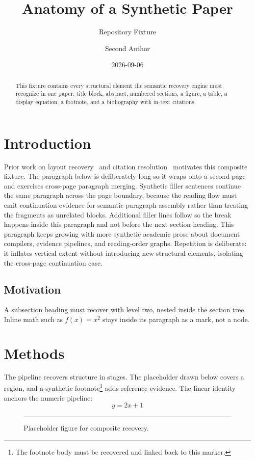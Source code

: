 \documentclass[11pt,a4paper]{article}
\title{Anatomy of a Synthetic Paper}
\author{Repository Fixture \and Second Author}
\date{2026-09-06}%
\begin{document}
\maketitle

\begin{abstract}
  This fixture contains every structural element the semantic recovery
  engine must recognize in one paper: title block, abstract, numbered
  sections, a figure, a table, a display equation, a footnote, and a
  bibliography with in-text citations.
\end{abstract}

\section{Introduction}
Prior work on layout recovery~\cite{smith2020docs} and citation
resolution~\cite{doe2021refs} motivates this composite fixture. The
paragraph below is deliberately long so it wraps onto a second page and
exercises cross-page paragraph merging.
Synthetic filler sentences continue the same paragraph across the page
boundary, because the reading flow must emit continuation evidence for
semantic paragraph assembly rather than treating the fragments as
unrelated blocks. Additional filler lines follow so the break happens
inside this paragraph and not before the next section heading. This
paragraph keeps growing with more synthetic academic prose about
document compilers, evidence pipelines, and reading-order graphs.
Repetition is deliberate: it inflates vertical extent without
introducing new structural elements, isolating the cross-page
continuation case.

\subsection{Motivation}
A subsection heading must recover with level two, nested inside the
section tree. Inline math such as \(f(x) = x^{2}\) stays inside its
paragraph as a mark, not a node.

\section{Methods}
The pipeline recovers structure in stages. The placeholder drawn below
covers a region, and a synthetic footnote\footnote{The footnote body
  must be recovered and linked back to this marker.} adds reference
evidence. The linear identity anchors the numeric pipeline:
\begin{equation}
  y = 2x + 1
\end{equation}
\begin{figure}[htbp]
  \centering
  \rule{0.5\textwidth}{3cm}%
  \caption{Placeholder figure for composite recovery.}
\end{figure}
\end{document}
